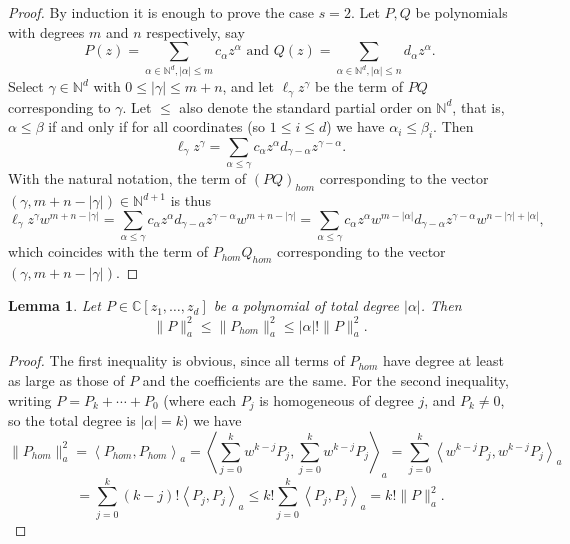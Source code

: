 \documentclass[12pt]{amsart}
\newtheorem{lemma}[theorem]{Lemma}
\newcommand{\N}{\mathbb{N}}
\begin{document}
\begin{proof} By induction it is enough to prove the case
$s = 2$.
Let $P , Q$ be polynomials with degrees $m$ and $n$ respectively, say
\[
P\left(  z \right)  =\sum_{\alpha\in\mathbb{N}^{d},\left\vert
\alpha\right\vert \leq m}c_{\alpha}z ^{\alpha}\text{ and }Q\left(  z\right)
=\sum_{\alpha\in\mathbb{N}^{d},\left\vert \alpha\right\vert \leq
n}d_{\alpha}z^{\alpha}.
\]
Select $\gamma \in \N^d$ with
$0 \le |\gamma | \le m + n$, and let $\ell_\gamma z^\gamma$ be the term of $PQ$ corresponding to $\gamma$.   Let $\le$ also denote the standard partial order on $\N^d$, that is, $\alpha \le \beta$ if and only if for all coordinates (so $1 \le i \le d$) we have $\alpha_i \le \beta_i$. Then 
\begin{equation}
\ell_\gamma z^\gamma 
=
\sum_{\alpha \le \gamma} c_{\alpha} z^\alpha d_{\gamma - \alpha} z^{\gamma - \alpha}.
\end{equation}
With the natural notation, the term of $(PQ)_{hom}$ corresponding to the vector $(\gamma, m + n - |\gamma|) \in \N^{d + 1}$ is thus
\begin{equation}
\ell_\gamma z^\gamma w^{m + n - |\gamma|}
=
\sum_{\alpha \le \gamma} c_{\alpha} z^\alpha d_{\gamma - \alpha} z^{\gamma - \alpha} w^{m + n - |\gamma|} 
= 
\sum_{\alpha \le \gamma} c_{\alpha} z^\alpha w^{m -  |\alpha|} d_{\gamma - \alpha} z^{\gamma - \alpha} w^{n -  |\gamma| +  |\alpha|},
\end{equation}
which coincides with the term of $P_{hom} Q_{hom}$ corresponding to the vector $(\gamma, m + n - |\gamma|)$.
\end{proof}

\begin{lemma}
\label{homogenization} Let $P  \in \mathbb{C}[z_{1},\dots,z_{d}]$ be a
	polynomial of total degree $|\alpha|$. Then 
	$$
	\|P\|_a^2 \le \|P_{hom}\|_a^2 \le   |\alpha| ! \|P\|_a^2.
	$$
	\end{lemma}


\begin{proof} The first inequality is obvious, since all terms of $P_{hom}$ have degree at least as large as those of $P$
and the coefficients are the same. For the second inequality, writing $P =P_{k} +\cdots +P_{0}$ (where each $P_j$ is homogeneous of degree $j$, and $P_k \ne 0$, so the total degree is $|\alpha | = k$) we have 
\begin{equation*}
\|P_{hom}\|_a^2
=
\left\langle P_{hom} ,P_{hom} \right\rangle_{a}   
=  
\left\langle \sum_{j = 0}^k w^{k - j} P_j, \sum_{j = 0}^k w^{k - j} P_j \right\rangle_{a}
=  
\sum_{j = 0}^k \left\langle  w^{k - j} P_j,  w^{k - j} P_j \right\rangle_{a}
\end{equation*}
\begin{equation*}
=  
\sum_{j = 0}^k (k - j)!\left\langle   P_j,  P_j \right\rangle_{a}
\le
k! \sum_{j = 0}^k \left\langle   P_j,  P_j \right\rangle_{a} = k! \|P\|_a^2.
\end{equation*}
\end{proof}
\end{document}
